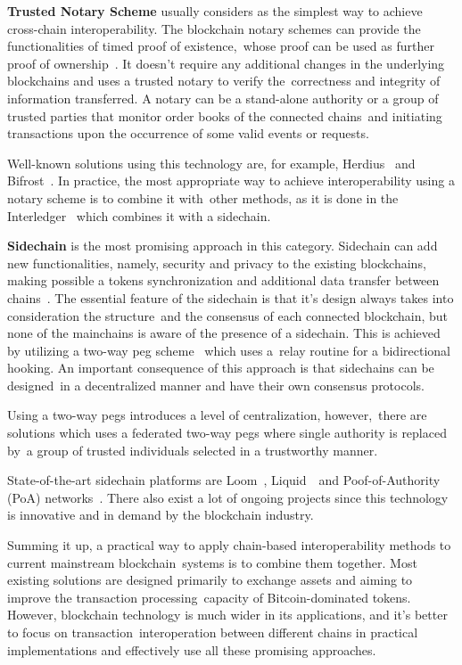 \textbf{Trusted Notary Scheme} usually considers as the simplest way to achieve cross-chain interoperability.
The blockchain notary schemes can provide the functionalities of timed proof of existence,\
whose proof can be used as further proof of ownership~\cite{DIFRANCESCOMAESA202099}.
It doesn't require any additional changes in the underlying blockchains and uses a trusted notary to verify the\
correctness and integrity of information transferred.
A notary can be a stand-alone authority or a group of trusted parties that monitor order books of the connected chains\
and initiating transactions upon the occurrence of some valid events or requests.

Well-known solutions using this technology are, for example, Herdius~\cite{Balazs2017} and Bifrost~\cite{Scheid2019}.
In practice, the most appropriate way to achieve interoperability using a notary scheme is to combine it with\
other methods, as it is done in the Interledger~\cite{Thomas2015} which combines it with a sidechain.

\textbf{Sidechain} is the most promising approach in this category.
Sidechain can add new functionalities, namely, security and privacy to the existing blockchains,
making possible a tokens synchronization and additional data transfer between chains~\cite{Parizi2019}.
The essential feature of the sidechain is that it's design always takes into consideration the structure\
and the consensus of each connected blockchain, but none of the mainchains is aware of the presence of a sidechain.
This is achieved by utilizing a two-way peg scheme~\cite{SINGH2020102471} which uses a\
relay routine for a bidirectional hooking.
An important consequence of this approach is that sidechains can be designed\
in a decentralized manner and have their own consensus protocols.

Using a two-way pegs introduces a level of centralization, however,\
there are solutions which uses a federated two-way pegs where single authority is replaced by\
a group of trusted individuals selected in a trustworthy manner.

State-of-the-art sidechain platforms are Loom~\cite{Loom2019}, Liquid~\cite{Nick2020LiquidAB}\
and Poof-of-Authority (PoA) networks~\cite{POA2018}.
There also exist a lot of ongoing projects since this technology is innovative and in demand by the blockchain industry.

Summing it up, a practical way to apply chain-based interoperability methods to current mainstream blockchain\
systems is to combine them together.
Most existing solutions are designed primarily to exchange assets and aiming to improve the transaction processing\
capacity of Bitcoin-dominated tokens.
However, blockchain technology is much wider in its applications, and it's better to focus on transaction\
interoperation between different chains in practical implementations and effectively use all these promising approaches.

